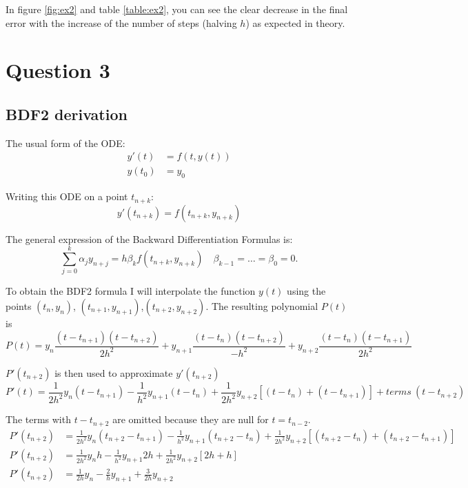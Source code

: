 \documentclass[a4paper, 11pt]{article}
\begin{document}
		In figure \ref{fig:ex2} and table \ref{table:ex2}, you can see the clear decrease in the final error with the increase of the number of steps (halving $h$) as expected in theory.		
		
		\section*{Question 3}
			\subsection*{BDF2 derivation}
			
				The usual form of the ODE:
				\begin{align}
					y'(t) &= f(t, y(t)) \\
					y(t_0) &= y_0
				\end{align}
			
				Writing this ODE on a point $t_{n+k}$:
				\begin{equation}
					y'(t_{n+k}) = f(t_{n+k}, y_{n+k}) 
				\end{equation}
			
				The general expression of the Backward Differentiation Formulas is:
				\begin{equation}
					\sum_{j=0}^{k}\alpha_j y_{n+j} = h \beta_k f(t_{n+k}, y_{n+k}) \quad \beta_{k-1} = \ldots = \beta_0 = 0.
				\end{equation}
			
				To obtain the BDF2 formula I will interpolate the function $y(t)$ using the points $(t_{n}, y_{n})$, $(t_{n+1}, y_{n+1})$,$(t_{n+2}, y_{n+2})$.
				The resulting polynomial $P(t)$ is
				\begin{equation}
					P(t) = y_n \frac{(t - t_{n+1})(t - t_{n+2})}{2h^2} + y_{n+1} \frac{(t - t_n)(t - t_{n+2})}{-h^2} + y_{n+2} \frac{(t - t_n)(t - t_{n+1})}{2h^2}
				\end{equation}
			
				$P'(t_{n+2})$ is then used to approximate $y'(t_{n+2})$
				\begin{equation}
					P'(t) = \frac{1}{2h^2} y_n(t-t_{n+1}) - \frac{1}{h^2} y_{n+1}(t-t_{n}) + \frac{1}{2h^2} y_{n+2}[(t-t_{n})+(t-t_{n+1})] + terms \ (t-t_{n+2})
				\end{equation}
			
				The terms with $t-t_{n+2}$ are omitted because they are null for $t = t_{n-2}$.
				\begin{align}
					P'(t_{n+2}) &= \frac{1}{2h^2} y_n(t_{n+2}-t_{n+1}) - \frac{1}{h^2} y_{n+1}(t_{n+2}-t_{n}) + \frac{1}{2h^2} y_{n+2}[(t_{n+2}-t_{n})+(t_{n+2}-t_{n+1})] \\
					P'(t_{n+2}) &= \frac{1}{2h^2} y_n h - \frac{1}{h^2} y_{n+1} 2h + \frac{1}{2h^2} y_{n+2}[2h+h] \\
					P'(t_{n+2}) &= \frac{1}{2h} y_n - \frac{2}{h} y_{n+1} + \frac{3}{2h} y_{n+2} \\
				\end{align}
			
\end{document}
